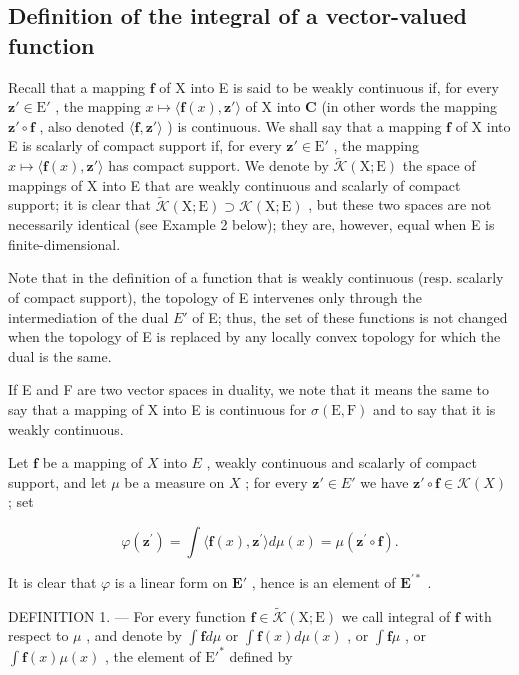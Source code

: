 \subsection{Definition of the integral of a vector-valued function}

Recall that a mapping \(\mathbf{f}\) of X into E is said to be weakly continuous if, for every \(\mathbf{z}' \in \mathrm{E}'\) , the mapping \(x \mapsto \langle \mathbf{f}(x), \mathbf{z}' \rangle\) of X into \(\mathbf{C}\) (in other words the mapping \(\mathbf{z}' \circ \mathbf{f}\) , also denoted \(\langle \mathbf{f}, \mathbf{z}' \rangle\) ) is continuous. We shall say that a mapping \(\mathbf{f}\) of X into E is scalarly of compact support if, for every \(\mathbf{z}' \in \mathrm{E}'\) , the mapping \(x \mapsto \langle \mathbf{f}(x), \mathbf{z}' \rangle\) has compact support. We denote by \(\widetilde{\mathcal{K}}(\mathrm{X};\mathrm{E})\) the space of mappings of X into E that are weakly continuous and scalarly of compact support; it is clear that \(\widetilde{\mathcal{K}}(\mathrm{X};\mathrm{E}) \supset \mathcal{K}(\mathrm{X};\mathrm{E})\) , but these two spaces are not necessarily identical (see Example 2 below); they are, however, equal when E is finite-dimensional.

Note that in the definition of a function that is weakly continuous (resp. scalarly of compact support), the topology of E intervenes only through the intermediation of the dual \(E'\) of E; thus, the set of these functions is not changed when the topology of E is replaced by any locally convex topology for which the dual is the same.

If E and F are two vector spaces in duality, we note that it means the same to say that a mapping of X into E is continuous for \(\sigma(\mathrm{E},\mathrm{F})\) and to say that it is weakly continuous.

Let \(\mathbf{f}\) be a mapping of \(X\) into \(E\) , weakly continuous and scalarly of compact support, and let \(\mu\) be a measure on \(X\) ; for every \(\mathbf{z}' \in E'\) we have \(\mathbf{z}' \circ \mathbf{f} \in \mathcal{K}(X)\) ; set

\[
\varphi (\mathbf {z} ^ {\prime}) = \int \langle \mathbf {f} (x), \mathbf {z} ^ {\prime} \rangle d \mu (x) = \mu (\mathbf {z} ^ {\prime} \circ \mathbf {f}).
\]

It is clear that \(\varphi\) is a linear form on \(\mathbf{E}'\) , hence is an element of \(\mathbf{E}^{\prime*}\) .

DEFINITION 1. --- For every function \(\mathbf{f} \in \widetilde{\mathcal{K}}(\mathrm{X};\mathrm{E})\) we call integral of \(\mathbf{f}\) with respect to \(\mu\) , and denote by \(\int \mathbf{f} d\mu\) or \(\int \mathbf{f}(x) d\mu(x)\) , or \(\int \mathbf{f}\mu\) , or \(\int \mathbf{f}(x)\mu(x)\) , the element of \(\mathrm{E}'^*\) defined by

